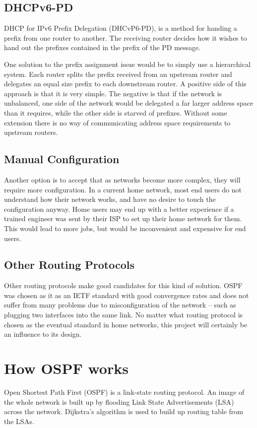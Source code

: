 \documentclass[12pt]{report}
\begin{document}
\subsection{DHCPv6-PD}
DHCP for IPv6 Prefix Delegation (DHCvP6-PD), is a method for handing a prefix from one router to
another. The receiving router decides how it wishes to hand out the prefixes
contained in the prefix of the PD message. 

One solution to the prefix assignment issue would be to simply use a
hierarchical system. Each router splits the prefix received from an upstream
router and delegates an equal size prefix to each downstream router. A positive
side of this approach is that it is very simple. The negative is that if the
network is unbalanced, one side of the network would be delegated a far larger
address space than it requires, while the other side is starved of prefixes.
Without some extension there is no way of communicating address space
requirements to upstream routers.   

\subsection{Manual Configuration}
Another option is to accept that as networks become more complex, they will
require more configuration. In a current home network, most end users do not
understand how their network works, and have no desire to touch the
configuration anyway. Home users may end up with a better experience if a
trained engineer was sent by their ISP to set up their home network for them.
This would lead to more jobs, but would be inconvenient and expensive for end
users.

\subsection{Other Routing Protocols}
Other routing protocols make good candidates for this kind of solution. OSPF
was chosen as it as an IETF standard with good convergence rates and does not
suffer from many problems due to misconfiguration of the network -- such as
plugging two interfaces into the same link. No matter what routing protocol is
chosen as the eventual standard in home networks, this project will certainly
be an influence to its design.

\section{How OSPF works}
Open Shortest Path First (OSPF) is a link-state routing protocol. An image of
the whole network is built up by flooding Link State Advertisements (LSA)
across the network. Dijkstra's algorithm is used to build up routing table from
the LSAs.
\end{document}

